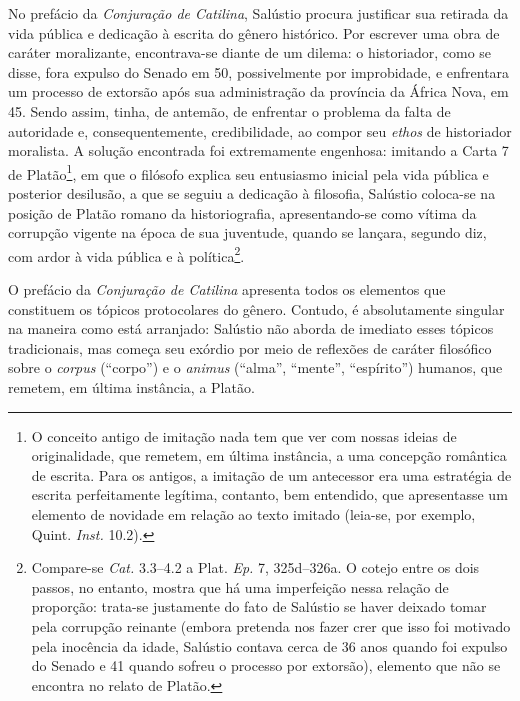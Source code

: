 No prefácio da \emph{Conjuração de Catilina}, Salústio procura justificar sua
retirada da vida pública e dedicação à escrita do gênero histórico. Por
escrever uma obra de caráter moralizante, encontrava-se diante de um dilema: o
historiador, como se disse, fora expulso do Senado em 50, possivelmente por
improbidade, e enfrentara um processo de extorsão após sua administração da
província da África Nova, em 45. Sendo assim, tinha, de antemão, de enfrentar o
problema da falta de autoridade e, consequentemente, credibilidade, ao compor seu \emph{ethos} 
de historiador moralista. A solução encontrada foi extremamente engenhosa: imitando a
Carta 7 de Platão\footnote{ O conceito antigo de imitação nada tem que ver com
nossas ideias de originalidade, que remetem, em última instância, a uma
concepção romântica de escrita. Para os antigos, a imitação de um antecessor
era uma estratégia de escrita perfeitamente legítima, contanto, bem entendido,
que apresentasse um elemento de novidade em relação ao texto imitado (leia-se, por exemplo, Quint. \emph{Inst.} 10.2).}, em que o filósofo explica seu entusiasmo
inicial pela vida pública e posterior desilusão, a que se seguiu a dedicação à
filosofia, Salústio coloca-se na posição de Platão romano da historiografia,
apresentando-se como vítima da corrupção vigente na época de sua juventude,
quando se lançara, segundo diz, com ardor à vida pública e à política\footnote{Compare-se \emph{Cat.} 3.3--4.2 a Plat. \emph{Ep.} 7, 325d--326a. O cotejo entre os dois
passos, no entanto, mostra que há uma imperfeição nessa relação de
proporção: trata-se justamente do fato de Salústio se haver deixado tomar pela
corrupção reinante (embora pretenda nos fazer crer que isso foi motivado
pela inocência da idade, Salústio contava cerca de 36 anos quando foi
expulso do Senado e 41 quando sofreu o processo por extorsão), elemento que não se encontra no relato de Platão.}. 


O prefácio da \emph{Conjuração de Catilina} apresenta todos os elementos que
constituem os tópicos protocolares do gênero. Contudo, é absolutamente singular
na maneira como está arranjado: Salústio não aborda de imediato esses tópicos
tradicionais, mas começa seu exórdio por meio de reflexões de caráter
filosófico sobre o \emph{corpus} (“corpo”) e o \emph{animus} (``alma'', ``mente'', “espírito”)
humanos, que remetem, em última instância, a Platão. 


